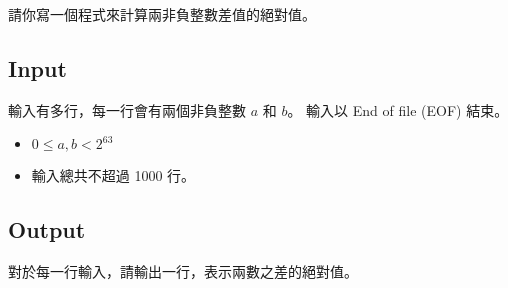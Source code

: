 
請你寫一個程式來計算兩非負整數差值的絕對值。

\subsection*{Input}

輸入有多行，每一行會有兩個非負整數 $a$ 和 $b$。
輸入以 End of file (EOF) 結束。

\begin{itemize}
    \item $0 \leq a, b < 2^{63}$
    \item 輸入總共不超過 1000 行。
\end{itemize}

\subsection*{Output}

對於每一行輸入，請輸出一行，表示兩數之差的絕對值。
